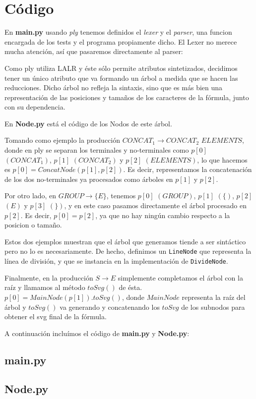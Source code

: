 \section{C\'odigo}

\par En \textbf{main.py} usando \textit{ply} tenemos definidos el \textit{lexer} y el \textit{parser}, una funcion encargada de los tests y el programa propiamente dicho. El Lexer no merece mucha atenci\'on, as\'i que pasaremos directamente al parser:
\par Como ply utiliza LALR y \'este s\'olo permite atributos sintetizados, decidimos tener un \'unico atributo que va formando un \'arbol a medida que se hacen las reducciones. Dicho \'arbol no refleja la sintaxis, sino que es m\'as bien una representaci\'on de las posiciones y tama\~nos de los caracteres de la f\'ormula, junto con su dependencia.
\par En \textbf{Node.py} est\'a el c\'odigo de los Nodos de este \'arbol.
\par Tomando como ejemplo la producci\'on $CONCAT_1 \rightarrow CONCAT_2$ $ELEMENTS$, donde en ply se separan los terminales y no-terminales como $p[0]$ $(CONCAT_1)$, $p[1]$ $(CONCAT_2)$ y $p[2]$ $(ELEMENTS)$, lo que hacemos es $p[0] = ConcatNode(p[1], p[2])$. Es decir, representamos la concatenaci\'on de los dos no-terminales ya procesados como \'arboles en $p[1]$ y $p[2]$.
\par Por otro lado, en $GROUP \rightarrow \{ E \}$, tenemos $p[0]$ $(GROUP)$, $p[1]$ $(\{)$, $p[2]$ $(E)$ y $p[3]$ $(\})$, y en este caso pasamos directamente el \'arbol procesado en $p[2]$. Es decir, $p[0] = p[2]$, ya que no hay ning\'un cambio respecto a la posicion o tama\~no.
\par Estos dos ejemplos muestran que el \'arbol que generamos tiende a ser sint\'actico pero no lo es necesariamente. De hecho, definimos un \texttt{LineNode} que representa la l\'inea de divisi\'on, y que se instancia en la implementaci\'on de \texttt{DivideNode}.
\par Finalmente, en la producci\'on $S \rightarrow E$ simplemente completamos el \'arbol con la ra\'iz y llamamos al m\'etodo $toSvg()$ de \'esta. $p[0] = MainNode(p[1]).toSvg()$, donde $MainNode$ representa la ra\'iz del \'arbol y $toSvg()$ va generando y concatenando los $toSvg$ de los subnodos para obtener el svg final de la f\'ormula.

\par \phantom{a}
\par A continuaci\'on inclu\'imos el c\'odigo de \textbf{main.py} y \textbf{Node.py}:

\subsection{main.py}


\newpage

\subsection{Node.py}
